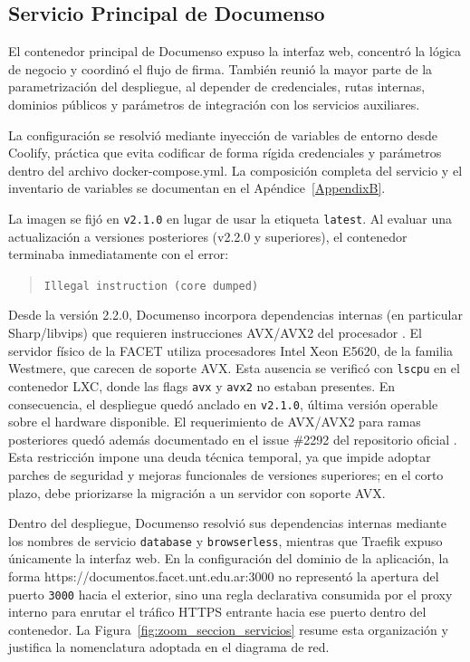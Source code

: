 \subsection{Servicio Principal de Documenso}
\label{subsec:documenso_core}

El contenedor principal de Documenso expuso la interfaz web, concentró la lógica de negocio y coordinó el flujo de firma. También reunió la mayor parte de la parametrización del despliegue, al depender de credenciales, rutas internas, dominios públicos y parámetros de integración con los servicios auxiliares.

La configuración se resolvió mediante inyección de variables de entorno desde Coolify, práctica que evita codificar de forma rígida credenciales y parámetros dentro del archivo docker-compose.yml. La composición completa del servicio y el inventario de variables se documentan en el Apéndice~\ref{AppendixB}.

La imagen se fijó en \texttt{v2.1.0} en lugar de usar la etiqueta \texttt{latest}. Al evaluar una actualización a versiones posteriores (v2.2.0 y superiores), el contenedor terminaba inmediatamente con el error:

\begin{quote}
\texttt{Illegal instruction (core dumped)}
\end{quote}

Desde la versión 2.2.0, Documenso incorpora dependencias internas (en particular Sharp/libvips) que requieren instrucciones AVX/AVX2 del procesador \cite{documenso_issue_2292}. El servidor físico de la FACET utiliza procesadores Intel Xeon E5620, de la familia Westmere, que carecen de soporte AVX. Esta ausencia se verificó con \texttt{lscpu} en el contenedor LXC, donde las flags \texttt{avx} y \texttt{avx2} no estaban presentes. En consecuencia, el despliegue quedó anclado en \texttt{v2.1.0}, última versión operable sobre el hardware disponible. El requerimiento de AVX/AVX2 para ramas posteriores quedó además documentado en el issue \#2292 del repositorio oficial \cite{documenso_issue_2292}. Esta restricción impone una deuda técnica temporal, ya que impide adoptar parches de seguridad y mejoras funcionales de versiones superiores; en el corto plazo, debe priorizarse la migración a un servidor con soporte AVX.

Dentro del despliegue, Documenso resolvió sus dependencias internas mediante los nombres de servicio \texttt{database} y \texttt{browserless}, mientras que Traefik expuso únicamente la interfaz web. En la configuración del dominio de la aplicación, la forma https://documentos.facet.unt.edu.ar:3000 no representó la apertura del puerto \texttt{3000} hacia el exterior, sino una regla declarativa consumida por el proxy interno para enrutar el tráfico HTTPS entrante hacia ese puerto dentro del contenedor. La Figura~\ref{fig:zoom_seccion_servicios} resume esta organización y justifica la nomenclatura adoptada en el diagrama de red.

